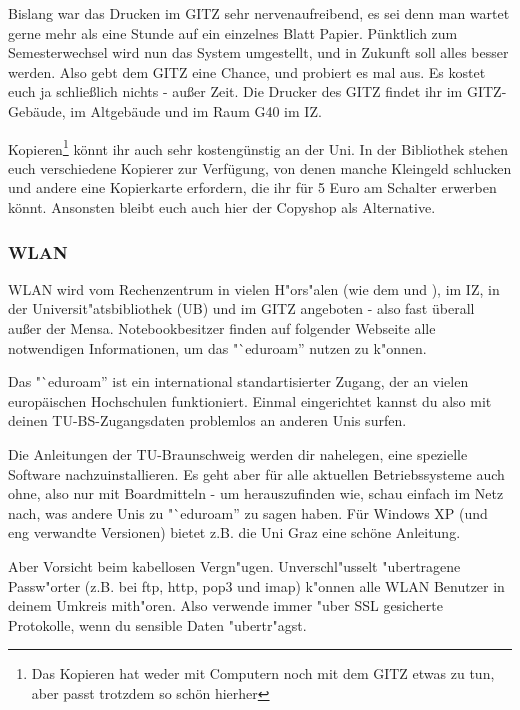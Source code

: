 Bislang war das Drucken im GITZ sehr nervenaufreibend, es sei denn man wartet gerne mehr als eine Stunde auf ein einzelnes Blatt Papier. Pünktlich zum Semesterwechsel wird nun das System umgestellt, und in Zukunft soll alles besser werden. Also gebt dem GITZ eine Chance, und probiert es mal aus. Es kostet euch ja schließlich nichts - außer Zeit. Die Drucker des GITZ findet ihr im GITZ-Gebäude, im Altgebäude und im Raum G40 im IZ.

Kopieren\footnote{Das Kopieren hat weder mit Computern noch mit dem GITZ etwas zu tun, aber passt trotzdem so schön hierher} könnt ihr auch sehr kostengünstig an der Uni. In der Bibliothek stehen euch verschiedene Kopierer zur Verfügung, von denen manche Kleingeld schlucken und andere eine Kopierkarte erfordern, die ihr für 5 Euro am Schalter erwerben könnt. Ansonsten bleibt euch auch hier der Copyshop als Alternative.

\subsubsection{WLAN}
\label{wlan}
WLAN wird vom Rechenzentrum in vielen H"ors"alen (wie dem  und
), im IZ, in der Universit"atsbibliothek (UB) und im GITZ angeboten - 
also fast überall außer der Mensa.
Notebookbesitzer finden auf folgender Webseite alle notwendigen Informationen, um 
das "`eduroam'' nutzen zu k"onnen.

Das "`eduroam'' ist ein international standartisierter Zugang, der an vielen 
europäischen Hochschulen funktioniert. Einmal eingerichtet kannst du also mit 
deinen TU-BS-Zugangsdaten problemlos an anderen Unis surfen.

Die Anleitungen der TU-Braunschweig werden dir nahelegen, eine spezielle Software 
nachzuinstallieren. Es geht aber für alle aktuellen Betriebssysteme auch ohne, also nur mit 
Boardmitteln - um herauszufinden wie, schau einfach im Netz nach, was andere 
Unis zu "`eduroam'' zu sagen haben. Für Windows XP (und eng verwandte Versionen) 
bietet z.B. die Uni Graz eine schöne Anleitung.

Aber Vorsicht beim kabellosen Vergn"ugen. Unverschl"usselt "ubertragene
Passw"orter (z.B. bei ftp, http, pop3 und imap) k"onnen alle WLAN
Benutzer in deinem Umkreis mith"oren. Also verwende immer "uber SSL
gesicherte Protokolle, wenn du sensible Daten "ubertr"agst.

